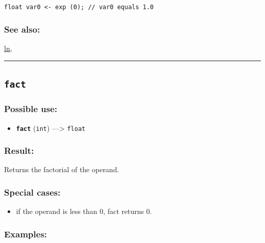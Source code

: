 \documentclass[]{book}
\providecommand{\tightlist}{%
  \setlength{\itemsep}{0pt}\setlength{\parskip}{0pt}}
\theoremstyle{definition}
\theoremstyle{definition}
\theoremstyle{definition}
\theoremstyle{remark}
\begin{document}
\begin{verbatim}
 
float var0 <- exp (0); // var0 equals 1.0
\end{verbatim}

\subsubsection{See also:}\label{see-also-90}

\href{operators-i-to-m.html\#ln}{ln},

\begin{center}\rule{0.5\linewidth}{\linethickness}\end{center}

\subsection{\texorpdfstring{\texttt{fact}}{fact}}\label{fact}

\subsubsection{Possible use:}\label{possible-use-161}

\begin{itemize}
\tightlist
\item
  \textbf{\texttt{fact}} (\texttt{int}) ---\textgreater{} \texttt{float}
\end{itemize}

\subsubsection{Result:}\label{result-155}

Returns the factorial of the operand.

\subsubsection{Special cases:}\label{special-cases-59}

\begin{itemize}
\tightlist
\item
  if the operand is less than 0, fact returns 0.
\end{itemize}

\subsubsection{Examples:}\label{examples-120}
\end{document}
